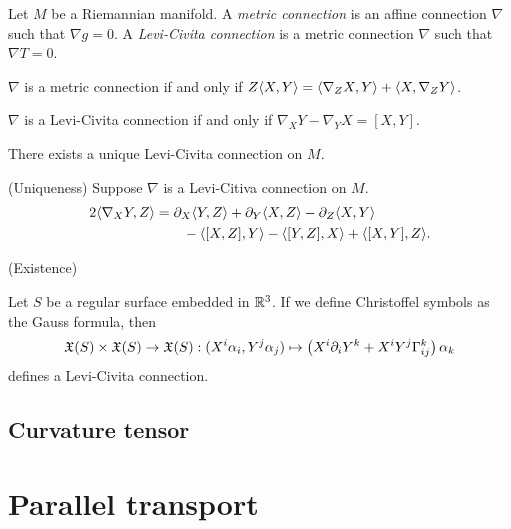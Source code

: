 \documentclass{../note}
\def\a{\alpha}
\begin{document}
\begin{prb}
Let $M$ be a Riemannian manifold.
A \emph{metric connection} is an affine connection $\nabla$ such that $\nabla g=0$.
A \emph{Levi-Civita connection} is a metric connection $\nabla$ such that $\nabla T=0$.
\begin{parts}
\item $\nabla$ is a metric connection if and only if $Z\langle X,Y\rangle=\langle\nabla_ZX,Y\rangle+\langle X,\nabla_ZY\rangle$.
\item $\nabla$ is a Levi-Civita connection if and only if $\nabla_XY-\nabla_YX=[X,Y]$.
\item There exists a unique Levi-Civita connection on $M$.
\end{parts}
\end{prb}
\begin{pf}
(Uniqueness)
Suppose $\nabla$ is a Levi-Citiva connection on $M$.
\begin{align*}
2\<\nabla_XY,Z\>&=\pd_X\<Y,Z\>+\pd_Y\<X,Z\>-\pd_Z\<X,Y\>\\
&\qquad-\<[X,Z],Y\>-\<[Y,Z],X\>+\<[X,Y],Z\>.
\end{align*}

(Existence)
\end{pf}

\begin{prb}
Let $S$ be a regular surface embedded in $\mathbb{R}^3$.
If we define Christoffel symbols as the Gauss formula, then
\[\fX(S)\times\fX(S)\to\fX(S):(X^i\a_i,Y^j\a_j)\mapsto\left(X^i\pd_iY^k+X^iY^j\Gamma_{ij}^k\right)\a_k\]
defines a Levi-Civita connection.
\end{prb}


\begin{prb}

\end{prb}


\section{Curvature tensor}



\chapter{Parallel transport}
\end{document}
